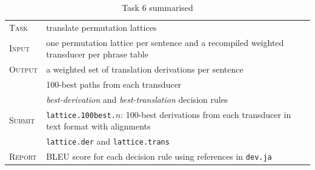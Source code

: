 \begin{table}[h]\centering
\begin{tabular}{l p{12cm}}
\textsc{Task}   &  translate permutation lattices\\
\textsc{Input}  &  one permutation lattice per sentence and a recompiled weighted transducer per phrase table\\
\textsc{Output} &  a weighted set of translation derivations per sentence\\
                &  100-best paths from each transducer \\
                & \emph{best-derivation} and \emph{best-translation} decision rules\\
\textsc{Submit} & \texttt{lattice.100best.}$n$: 100-best derivations from each transducer in text format with alignments\\
                & \texttt{lattice.der} and \texttt{lattice.trans} \\  
\textsc{Report} & BLEU score for each decision rule using references in \texttt{dev.ja}\\
\end{tabular}
\caption{\label{tab:task6}Task 6 summarised}
\end{table}

